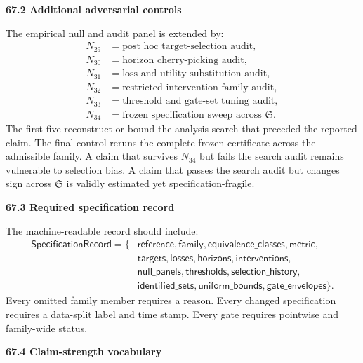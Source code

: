 \documentclass[11pt,letterpaper]{article}
\newcommand{\subtopic}[1]{%
 \vspace{0.45em}
 {\bfseries\color{AccentColor} #1\par}
}
\theoremstyle{plain}
\theoremstyle{definition}
\begin{document}
\subtopic{67.2 Additional adversarial controls}

The empirical null and audit panel is extended by:
\[
\begin{aligned}
N_{29}&=\text{post hoc target-selection audit},\\
N_{30}&=\text{horizon cherry-picking audit},\\
N_{31}&=\text{loss and utility substitution audit},\\
N_{32}&=\text{restricted intervention-family audit},\\
N_{33}&=\text{threshold and gate-set tuning audit},\\
N_{34}&=\text{frozen specification sweep across }\mathfrak S.
\end{aligned}
\]
The first five reconstruct or bound the analysis search that preceded the
reported claim. The final control reruns the complete frozen certificate across
the admissible family. A claim that survives \(N_{34}\) but fails the search
audit remains vulnerable to selection bias. A claim that passes the search
audit but changes sign across \(\mathfrak S\) is validly estimated yet
specification-fragile.

\subtopic{67.3 Required specification record}

The machine-readable record should include:
\[
\boxed{
\begin{aligned}
\mathsf{SpecificationRecord}
=\{&
\mathsf{reference},
\mathsf{family},
\mathsf{equivalence\_classes},
\mathsf{metric},\\
&\mathsf{targets},
\mathsf{losses},
\mathsf{horizons},
\mathsf{interventions},\\
&\mathsf{null\_panels},
\mathsf{thresholds},
\mathsf{selection\_history},\\
&\mathsf{identified\_sets},
\mathsf{uniform\_bounds},
\mathsf{gate\_envelopes}
\}.
\end{aligned}
}
\]
Every omitted family member requires a reason. Every changed specification
requires a data-split label and time stamp. Every gate requires pointwise and
family-wide status.

\subtopic{67.4 Claim-strength vocabulary}
\end{document}
